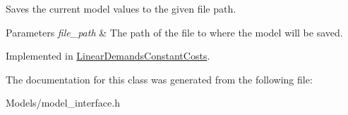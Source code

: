 Saves the current model values to the given file path.


\begin{DoxyParams}{Parameters}
{\em file\+\_\+path} & The path of the file to where the model will be saved. \\
\hline
\end{DoxyParams}


Implemented in \hyperlink{classLinearDemandsConstantCosts_aef2823751866a4933a8611dd4622d78b}{Linear\+Demands\+Constant\+Costs}.



The documentation for this class was generated from the following file\+:\begin{DoxyCompactItemize}
\item 
Models/model\+\_\+interface.\+h\end{DoxyCompactItemize}
